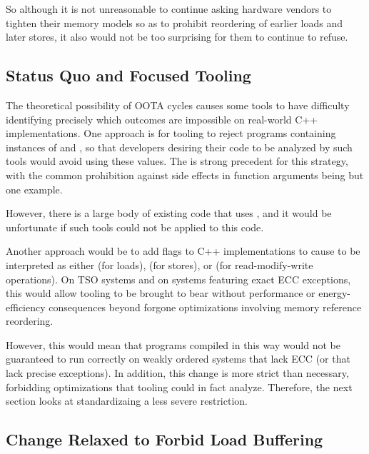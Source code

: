 \documentclass[10]{article}
\begin{document}
So although it is not unreasonable to continue asking hardware vendors
to tighten their memory models so as to prohibit reordering of earlier
loads and later stores, it also would not be too surprising for them to
continue to refuse.

\subsection{Status Quo and Focused Tooling}
\label{sec:Status Quo and Focused Tooling}

The theoretical possibility of OOTA cycles causes some tools to have
difficulty identifying precisely which outcomes are impossible on
real-world C++ implementations.
One approach is for tooling to reject programs containing instances
of  and , so that
developers desiring their code to be analyzed by such tools would
avoid using these  values.
The is strong precedent for this strategy, with the common prohibition
against side effects in function arguments being but one example.

However, there is a large body of existing code that uses
, and it would be unfortunate if such tools
could not be applied to this code.

Another approach would be to add flags to C++ implementations
to cause  to be interpreted as either
 (for loads),  (for
stores), or  (for read-modify-write operations).
On TSO systems and on systems featuring exact ECC exceptions, this
would allow tooling to be brought to bear without performance or
energy-efficiency consequences beyond forgone optimizations involving
memory reference reordering.

However, this would mean that programs compiled in this way would not
be guaranteed to run correctly on weakly ordered systems that lack
ECC (or that lack precise exceptions).
In addition, this change is more strict than necessary, forbidding
optimizations that tooling could in fact analyze.
Therefore, the next section looks at standardizaing a less severe
restriction.

\subsection{Change Relaxed to Forbid Load Buffering}
\label{sec:Change Relaxed to Forbid Load Buffering}
\end{document}

